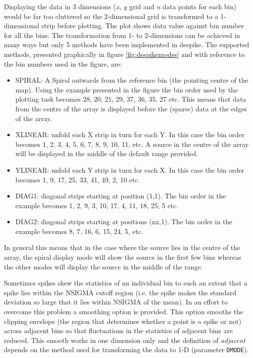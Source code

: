 \documentclass[twoside,11pt]{article}
\newcommand{\task}[1]{{\sf #1}}
\newcommand{\param}[1]{{\tt #1}}
\newcommand{\despike}{\htmlref{\task{despike}}{DESPIKE}}
\newcommand{\htmlref}[2]{#1}
\renewcommand{\_}{\texttt{\symbol{95}}}
\begin{document}
Displaying the data in 3 dimensions (\textit{x, y} grid and \textit{n} data points
for each bin) would be far too cluttered so the 2-dimensional grid is
transformed to a 1-dimensional strip before plotting. The plot shows data
value against bin  number for all the bins. The transformation from 1- to
2-dimensions can be achieved in many ways but only 5 methods have been
implemented in \despike.  The supported methods, presented graphically in
figure \ref{fig:despikemodes} and with reference to the bin numbers used in
the figure, are:


\begin{itemize} 

\item SPIRAL: A Spiral
outwards from the reference bin (the pointing centre of the map). Using the example presented in the figure
the bin order used by the plotting task becomes 28, 20, 21, 29, 37, 36, 35,
27 etc. This means that data from the centre of the array is displayed before
the (sparse) data at the edges of the array.

	\item XLINEAR: unfold each X strip in turn for each Y. In this case
the bin order becomes 1, 2, 3, 4, 5, 6, 7, 8, 9, 10, 11, etc. A source in
the centre of the array will be displayed in the middle of the default range
provided. 

	\item YLINEAR:  unfold each Y strip in turn for each X. In this case
the bin order becomes 1, 9, 17, 25, 33, 41, 49, 2, 10 etc.    

	\item DIAG1:    diagonal strips starting at position (1,1). The bin
order in the example becomes 1, 2, 9, 3, 10, 17, 4, 11, 18, 25, 5 etc.

	\item DIAG2:   diagonal strips starting at positions (nx,1). The bin 
order in the example becomes 8, 7, 16, 6, 15, 24, 5, etc.
	
\end{itemize}

In general this means that in the case where the source lies in the centre of
the array, the spiral display mode will show the source in the first
few bins whereas the other modes will display the source in the middle of
the range.

Sometimes spikes skew the statistics of an individual bin to such an extent
that a spike lies within the NSIGMA cutoff region (i.e. the spike makes the
standard deviation so large that it lies within NSIGMA of the mean). In an
effort to overcome this problem a smoothing option is provided. 
This option smooths the clipping envelope (the region that determines whether
a point is a spike or not) across adjacent bins so that fluctuations in the
statistics of adjacent bins are reduced. This smooth works in one dimension
only and the definition of \textit{adjacent} depends on the method used for
transforming the data to 1-D (parameter \param{DMODE}).
\end{document}
